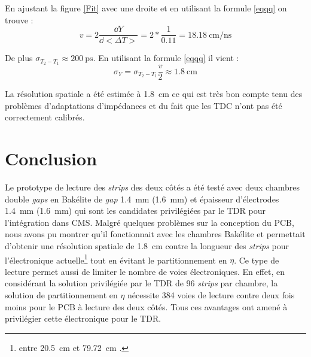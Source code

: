 En ajustant la figure \ref{Fit} avec une droite et en utilisant la formule \ref{eqqq} on trouve :
\begin{equation}
v=2\frac{\dd Y}{\dd <\Delta T>}=2*\frac{1}{0.11}=\SI{18.18}{\centi\meter\per\nano\second}
\end{equation}

De plus $\sigma_{T_2-T_1}\approx\SI{200}{\pico\second}$. En utilisant la formule \ref{eqqq} il vient :
\begin{equation}
\sigma_{Y}=\sigma_{T_2-T_1}\frac{v}{2}\approx\SI{1.8}{\centi\meter}
\end{equation}

La résolution spatiale a été estimée à \SI{1.8}{\centi\meter} ce qui est très bon compte tenu des problèmes d'adaptations d'impédances et du fait que les TDC n'ont pas été correctement calibrés.

\section{Conclusion}
Le prototype de lecture des \textit{strips} des deux côtés a été testé avec deux chambres double \textit{gaps} en Bakélite de \textit{gap} \SI{1.4}{\milli\meter} (\SI{1.6}{\milli\meter}) et épaisseur d'électrodes \SI{1.4}{\milli\meter} (\SI{1.6}{\milli\meter}) qui sont les candidates privilégiées par le TDR pour l'intégration dans CMS. Malgré quelques problèmes sur la conception du PCB, nous avons pu montrer qu'il fonctionnait avec les chambres Bakélite et permettait d'obtenir une résolution spatiale de \SI{1.8}{\centi\meter} contre la longueur des \textit{strips} pour l'électronique actuelle\footnote{entre \SI{20.5}{\centi\meter} et \SI{79.72}{\centi\meter} \cite{gapss}.} tout en évitant le partitionnement en $\eta$. Ce type de lecture permet aussi de limiter le nombre de voies électroniques. En effet, en considérant la solution privilégiée par le TDR de \num{96} \textit{strips} par chambre, la solution de partitionnement en $\eta$ nécessite \num{384} voies de lecture contre deux fois moins pour le PCB à lecture des deux côtés. Tous ces avantages ont amené à privilégier cette électronique pour le TDR.